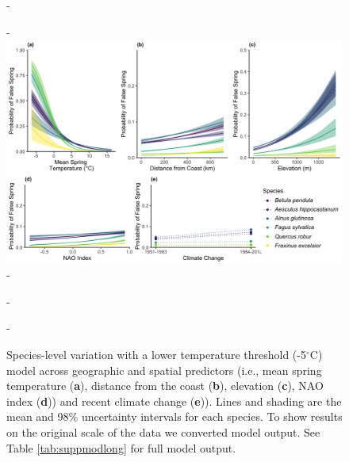 \documentclass{article}\usepackage[]{graphicx}\usepackage[]{color}
\begin{document}
{\begin{figure} [H]
  -\begin{center}
  -\includegraphics[width=16cm]{..//..//analyses/figures/InteractionPlots/Species_fivelong.png}
  -\caption{Species-level variation with a lower temperature threshold (-5$^{\circ}$C) model across geographic and spatial predictors (i.e., mean spring temperature (\textbf{a}), distance from the coast (\textbf{b}), elevation (\textbf{c}), NAO index (\textbf{d})) and recent climate change (\textbf{e})). Lines and shading are the mean and 98\% uncertainty intervals for each species. To show results on the original scale of the data we converted model output. See Table \ref{tab:suppmodlong} for full model output. }\label{fig:sppfive}
  -\end{center}
  -\end{figure}}
\end{document}
